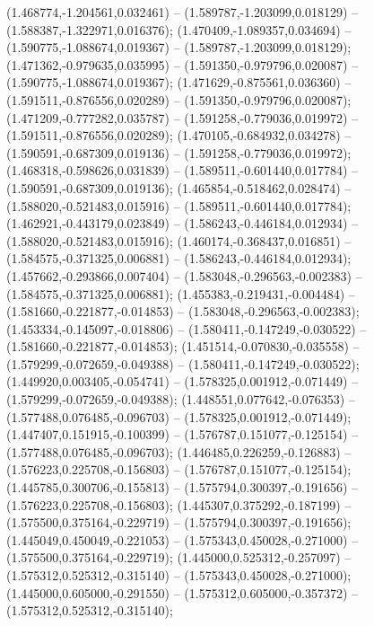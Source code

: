  (1.468774,-1.204561,0.032461) -- (1.589787,-1.203099,0.018129) -- (1.588387,-1.322971,0.016376);
 (1.470409,-1.089357,0.034694) -- (1.590775,-1.088674,0.019367) -- (1.589787,-1.203099,0.018129);
 (1.471362,-0.979635,0.035995) -- (1.591350,-0.979796,0.020087) -- (1.590775,-1.088674,0.019367);
 (1.471629,-0.875561,0.036360) -- (1.591511,-0.876556,0.020289) -- (1.591350,-0.979796,0.020087);
 (1.471209,-0.777282,0.035787) -- (1.591258,-0.779036,0.019972) -- (1.591511,-0.876556,0.020289);
 (1.470105,-0.684932,0.034278) -- (1.590591,-0.687309,0.019136) -- (1.591258,-0.779036,0.019972);
 (1.468318,-0.598626,0.031839) -- (1.589511,-0.601440,0.017784) -- (1.590591,-0.687309,0.019136);
 (1.465854,-0.518462,0.028474) -- (1.588020,-0.521483,0.015916) -- (1.589511,-0.601440,0.017784);
 (1.462921,-0.443179,0.023849) -- (1.586243,-0.446184,0.012934) -- (1.588020,-0.521483,0.015916);
 (1.460174,-0.368437,0.016851) -- (1.584575,-0.371325,0.006881) -- (1.586243,-0.446184,0.012934);
 (1.457662,-0.293866,0.007404) -- (1.583048,-0.296563,-0.002383) -- (1.584575,-0.371325,0.006881);
 (1.455383,-0.219431,-0.004484) -- (1.581660,-0.221877,-0.014853) -- (1.583048,-0.296563,-0.002383);
 (1.453334,-0.145097,-0.018806) -- (1.580411,-0.147249,-0.030522) -- (1.581660,-0.221877,-0.014853);
 (1.451514,-0.070830,-0.035558) -- (1.579299,-0.072659,-0.049388) -- (1.580411,-0.147249,-0.030522);
 (1.449920,0.003405,-0.054741) -- (1.578325,0.001912,-0.071449) -- (1.579299,-0.072659,-0.049388);
 (1.448551,0.077642,-0.076353) -- (1.577488,0.076485,-0.096703) -- (1.578325,0.001912,-0.071449);
 (1.447407,0.151915,-0.100399) -- (1.576787,0.151077,-0.125154) -- (1.577488,0.076485,-0.096703);
 (1.446485,0.226259,-0.126883) -- (1.576223,0.225708,-0.156803) -- (1.576787,0.151077,-0.125154);
 (1.445785,0.300706,-0.155813) -- (1.575794,0.300397,-0.191656) -- (1.576223,0.225708,-0.156803);
 (1.445307,0.375292,-0.187199) -- (1.575500,0.375164,-0.229719) -- (1.575794,0.300397,-0.191656);
 (1.445049,0.450049,-0.221053) -- (1.575343,0.450028,-0.271000) -- (1.575500,0.375164,-0.229719);
 (1.445000,0.525312,-0.257097) -- (1.575312,0.525312,-0.315140) -- (1.575343,0.450028,-0.271000);
 (1.445000,0.605000,-0.291550) -- (1.575312,0.605000,-0.357372) -- (1.575312,0.525312,-0.315140);
